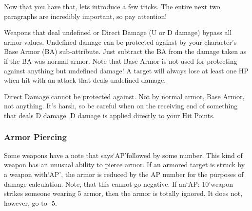 \documentclass[twoside]{book}
\begin{document}
  
  

  

  
    {  
    Now that you have that, lets introduce a few tricks. The entire next two paragraphs are incredibly important, so pay attention!
    }
  
    {  
    Weapons that deal undefined or Direct Damage (U or D damage) bypass all armor values. Undefined damage can be protected against by your character's Base Armor (BA) sub-attribute. Just subtract the BA from the damage taken as if the BA was normal armor. Note that Base Armor is not used for protecting against anything but undefined damage! A target will always lose at least one HP when hit with an attack that deals undefined damage.
    }
  
    {  
    Direct Damage cannot be protected against. Not by normal armor, Base Armor, not anything. It's harsh, so be careful when on the receiving end of something that deals D damage. D damage is applied directly to your Hit Points.
    }
  
    

\subsubsection{Armor Piercing}
    
    {  
    Some weapons have a note that says`AP'followed by some number. This kind of weapon has an unusual ability to pierce armor. If an armored target is struck by a weapon with`AP', the armor is reduced by the AP number for the purposes of damage calculation. Note, that this cannot go negative. If an`AP: 10'weapon strikes someone wearing 5 armor, then the armor is totally ignored. It does not, however, go to -5.
    }
  
\end{document}

